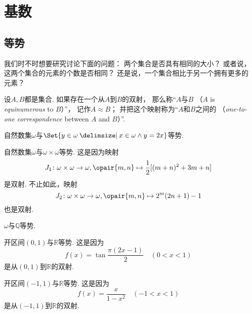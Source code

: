 \section{基数}
\subsection{等势}
我们时不时想要研究讨论下面的问题：
两个集合是否具有相同的大小？
或者说，这两个集合的元素的个数是否相同？
还是说，一个集合相比于另一个拥有更多的元素？

\begin{definition}
设\(A,B\)都是集合.
如果存在一个从\(A\)到\(B\)的双射，
那么称“\(A\)与\(B\) （\(A\) is \emph{equinumerous} to \(B\)）”，
记作\(A \approx B\)；
并把这个映射称为“\(A\)和\(B\)之间的%
（\emph{one-to-one correspondence} between \(A\) and \(B\)）”.
\end{definition}

\begin{example}
自然数集\(\omega\)与\(\Set{ y \in \omega \given x \in \omega \land y = 2x }\)等势.
\end{example}

\begin{example}
自然数集\(\omega\)与\(\omega\times\omega\)等势.
这是因为映射\[
	J_1\colon \omega\times\omega\to\omega,
	\opair{m,n} \mapsto \frac12[(m+n)^2+3m+n]
\]是双射.
不止如此，映射\[
	J_2\colon \omega\times\omega\to\omega,
	\opair{m,n} \mapsto 2^m(2n+1)-1
\]也是双射.
\end{example}

\begin{example}
\(\omega\)与\(\mathbb{Q}\)等势.
\end{example}

\begin{example}\label{example:基数.开区间与全体实数等势1}
开区间\((0,1)\)与\(\mathbb{R}\)等势.
这是因为\[
	f(x) = \tan\frac{\pi(2x-1)}2
	\quad(0<x<1)
\]是从\((0,1)\)到\(\mathbb{R}\)的双射.
\end{example}

\begin{example}\label{example:基数.开区间与全体实数等势2}
开区间\((-1,1)\)与\(\mathbb{R}\)等势.
这是因为\[
	f(x) = \frac{x}{1-x^2}
	\quad(-1<x<1)
\]是从\((-1,1)\)到\(\mathbb{R}\)的双射.
\end{example}

